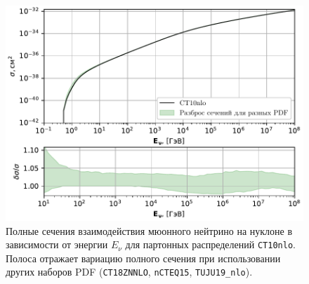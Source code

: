 \begin{figure}[!h]
\centering
\includegraphics[width=\linewidth]{images/NuProp/xs_vs_enu.pdf}
\caption{Полные сечения взаимодействия мюонного нейтрино на нуклоне в зависимости от энергии $E_\nu$ для партонных распределений \texttt{CT10nlo}. 
Полоса отражает вариацию полного сечения при использовании других наборов PDF (\texttt{CT18ZNNLO}, \texttt{nCTEQ15}, \texttt{TUJU19\_nlo}).} 
\label{fig:xsec_total}
\end{figure}

